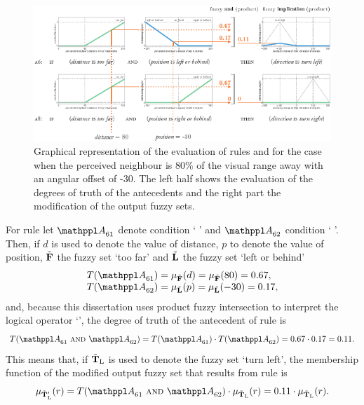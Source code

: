 \begin{figure}%
\includegraphics{fig[attractionFLSa6+a8]}
\caption{Graphical representation of the evaluation of rules  and  for the case when the perceived neighbour is 80\% of the visual range away with an angular offset of -30\deg. The left half shows the evaluation of the degrees of truth of the antecedents and the right part the modification of the output fuzzy sets.}
\label{fig:attraction:FLS:a6+a8}
\end{figure}

For rule  let $\statement{A}_{61}$ denote condition `  ' and $\statement{A}_{62}$ condition `  '. Then, if $d$ is used to denote the value of distance, $p$ to denote the value of position, ${\tilde{{\mathbf{F}}}}$ the fuzzy set `too far' and ${\tilde{{\mathbf{L}}}}$ the fuzzy set `left or behind'
\begin{equation}
\begin{array}{ll}
T(\statement{A}_{61})=\mu_\fset{F}(d)=\mu_\fset{F}(80)=0.67, \\
T(\statement{A}_{62})=\mu_\fset{L}(p)=\mu_\fset{L}(-30)=0.17,
\end{array}
\end{equation}
and, because this dissertation uses product fuzzy intersection to interpret the logical operator `', the degree of truth of the antecedent of rule  is 
\begin{equation}
T(\statement{A}_{61}\ \kwd{and}\ \statement{A}_{62})=T(\statement{A}_{61}) \cdot T(\statement{A}_{62})=0.67 \cdot 0.17 = 0.11.
\end{equation}
This means that, if ${\tilde{{\mathbf{T}}}}_\mathrm{L}$ is used to denote the fuzzy set `turn left', the membership function of the modified output fuzzy set that results from rule  is 
\begin{equation}
\mu_{{\fset{T}_\mathrm{L}}'}(r)=T(\statement{A}_{61}\ \kwd{and}\ \statement{A}_{62}) \cdot \mu_{\fset{T}_\mathrm{L}}(r)=0.11 \cdot \mu_{\fset{T}_\mathrm{L}}(r).
\end{equation}

